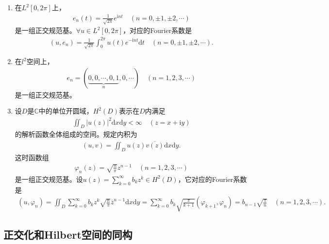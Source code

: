 \documentclass[../../main.tex]{subfiles}%
\begin{document}
\begin{proposition}\label{proposition:H2D空间--泛函分析}
\begin{enumerate}[(1)]
\item\label{proposition:H2D空间--泛函分析-1} 在$L^2[0, 2\pi]$上，
\begin{align*}
e_n(t) = \frac{1}{\sqrt{2\pi}} e^{\mathrm{i}nt} \quad (n=0, \pm1, \pm2, \cdots)
\end{align*}
是一组正交规范基。$\forall u \in L^2[0, 2\pi]$，对应的Fourier系数是
\begin{align*}
(u, e_n) = \frac{1}{\sqrt{2\pi}} \int_{0}^{2\pi} u(t) e^{-\mathrm{i}nt} \mathrm{d}t \quad (n=0, \pm1, \pm2, \cdots).
\end{align*}

\item\label{proposition:H2D空间--泛函分析-2} 在$l^2$空间上，
\begin{align*}
e_n = (\underbrace{0, 0, \cdots, 0, 1}_{n}, 0, \cdots) \quad (n=1,2,3,\cdots)
\end{align*}
是一组正交规范基。

\item\label{proposition:H2D空间--泛函分析-3} 设$D$是$\mathbb{C}$中的单位开圆域，$H^2(D)$表示在$D$内满足
\begin{align*}
\iint_{D} |u(z)|^2 \mathrm{d}x\mathrm{d}y < \infty \quad (z=x+\mathrm{i}y)
\end{align*}
的解析函数全体组成的空间。规定内积为
\begin{align*}
(u, v) = \iint_{D} u(z) \overline{v(z)} \mathrm{d}x\mathrm{d}y.
\end{align*}
这时函数组
\begin{align*}
\varphi_n(z) = \sqrt{\frac{n}{\pi}} z^{n-1} \quad (n=1,2,3,\cdots)
\end{align*}
是一组正交规范基。设$u(z) = \sum\limits_{k=0}^{\infty} b_k z^k \in H^2(D)$，它对应的Fourier系数是
\begin{align*}
(u, \varphi_n) = \iint_{D} \sum\limits_{k=0}^{\infty} b_k z^k \sqrt{\frac{n}{\pi}} \overline{z}^{n-1} \mathrm{d}x\mathrm{d}y 
= \sum\limits_{k=0}^{\infty} b_k \sqrt{\frac{\pi}{k+1}} (\varphi_{k+1}, \varphi_n) = b_{n-1} \sqrt{\frac{\pi}{n}} \quad (n=1,2,3,\cdots).
\end{align*}
\end{enumerate}
\end{proposition}


\subsection{正交化和Hilbert空间的同构}
\end{document}

